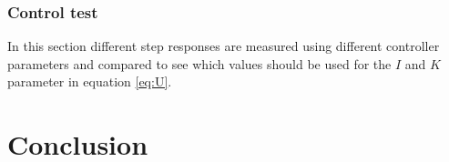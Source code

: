 \documentclass[12pt,a4paper]{article}
\begin{document}
\subsubsection{Control test}\label{sec:control_test}
In this section different step responses are measured using different controller parameters and compared to see which values should be used for the $I$ and $K$ parameter in equation \ref{eq:U}.







\section{Conclusion} \label{sec:conc}



\clearpage
\lhead{ }
\end{document}
